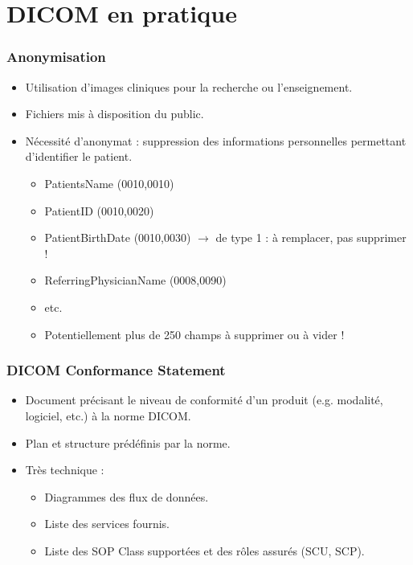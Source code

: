 \section{DICOM en pratique}

\frame
{
	\frametitle{Anonymisation}
	\begin{itemize}
		\item Utilisation d'images cliniques pour la recherche ou l'enseignement.
		\item<2-> Fichiers mis \`a disposition du public.
		\item<3-> N\'ecessit\'e d'anonymat : suppression des informations personnelles permettant d'identifier le patient.
		\begin{itemize}
			\item<4-> PatientsName (0010,0010)
			\item<5-> PatientID (0010,0020)
			\item<6-> PatientBirthDate (0010,0030) $\rightarrow$ de type 1 : \`a remplacer, pas supprimer !
			\item<7-> ReferringPhysicianName (0008,0090)
			\item<7-> etc.
			\item<8-> Potentiellement plus de 250 champs \`a supprimer ou \`a vider !
		\end{itemize}
	\end{itemize}
}

\frame
{
	\frametitle{DICOM Conformance Statement}
	\begin{itemize}
		\item Document pr\'ecisant le niveau de conformit\'e d'un produit (e.g. modalit\'e, logiciel, etc.) \`a la norme DICOM.
		\item<2-> Plan et structure pr\'ed\'efinis par la norme.
		\item<3-> Tr\`es technique :
		\begin{itemize}
			\item<4-> Diagrammes des flux de donn\'ees.
			\item<5-> Liste des services fournis.
			\item<6-> Liste des SOP Class support\'ees et des r\^oles assur\'es (SCU, SCP).
		\end{itemize}
	\end{itemize}
}

